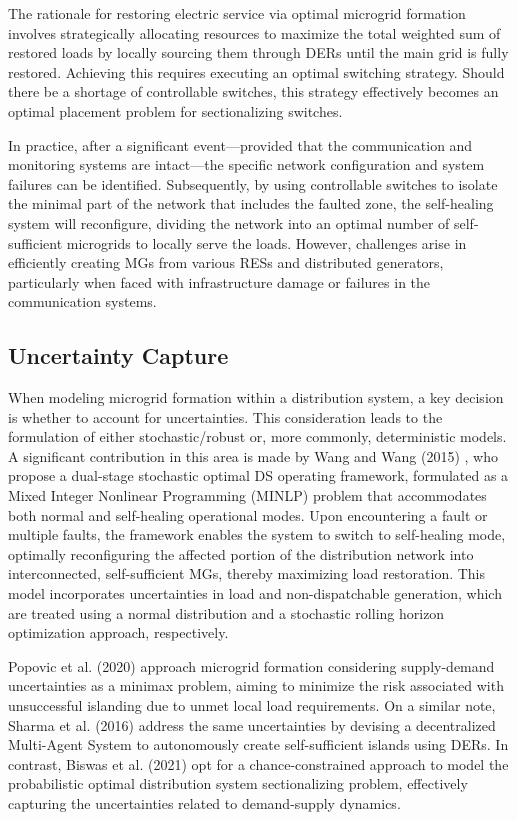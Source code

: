 \documentclass[conference]{IEEEtran}
\begin{document}
The rationale for restoring electric service via optimal microgrid formation involves strategically allocating resources to maximize the total weighted sum of restored loads by locally sourcing them through DERs until the main grid is fully restored. Achieving this requires executing an optimal switching strategy. Should there be a shortage of controllable switches, this strategy effectively becomes an optimal placement problem for sectionalizing switches.

In practice, after a significant event—provided that the communication and monitoring systems are intact—the specific network configuration and system failures can be identified. Subsequently, by using controllable switches to isolate the minimal part of the network that includes the faulted zone, the self-healing system will reconfigure, dividing the network into an optimal number of self-sufficient microgrids to locally serve the loads. However, challenges arise in efficiently creating MGs from various RESs and distributed generators, particularly when faced with infrastructure damage or failures in the communication systems.

\subsection{Uncertainty Capture}
When modeling microgrid formation within a distribution system, a key decision is whether to account for uncertainties. This consideration leads to the formulation of either stochastic/robust or, more commonly, deterministic models. A significant contribution in this area is made by Wang and Wang (2015) \cite{b7}, who propose a dual-stage stochastic optimal DS operating framework, formulated as a Mixed Integer Nonlinear Programming (MINLP) problem that accommodates both normal and self-healing operational modes. Upon encountering a fault or multiple faults, the framework enables the system to switch to self-healing mode, optimally reconfiguring the affected portion of the distribution network into interconnected, self-sufficient MGs, thereby maximizing load restoration. This model incorporates uncertainties in load and non-dispatchable generation, which are treated using a normal distribution and a stochastic rolling horizon optimization approach, respectively.

Popovic et al. (2020) \cite{b8} approach microgrid formation considering supply-demand uncertainties as a minimax problem, aiming to minimize the risk associated with unsuccessful islanding due to unmet local load requirements. On a similar note, Sharma et al. (2016) \cite{b9} address the same uncertainties by devising a decentralized Multi-Agent System to autonomously create self-sufficient islands using DERs. In contrast, Biswas et al. (2021) \cite{b10} opt for a chance-constrained approach to model the probabilistic optimal distribution system sectionalizing problem, effectively capturing the uncertainties related to demand-supply dynamics.
\end{document}
